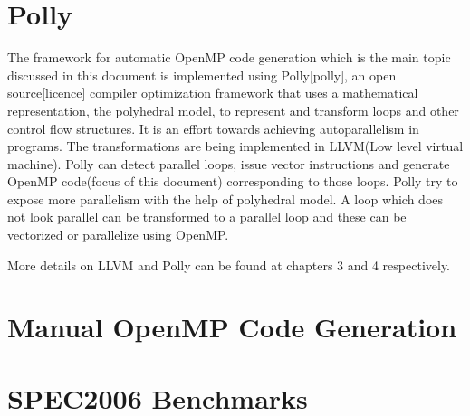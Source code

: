 \documentclass[a4paper,12pt]{book}
\begin{document}
\section{Polly}
The framework for automatic OpenMP code generation which is the main topic 
discussed in this document is implemented using Polly[polly],
an open source[licence] compiler  optimization framework that uses a mathematical
 representation, the polyhedral model, to represent and transform loops and other
 control flow structures. It is an effort towards achieving autoparallelism in programs.
 The transformations are being implemented in LLVM(Low level virtual machine). 
Polly can detect parallel loops, issue vector instructions and generate OpenMP code(focus of 
this document) corresponding to those loops. Polly try to expose more parallelism
with the help of polyhedral model. A loop which does not look parallel can be transformed
to a parallel loop and these can be vectorized or parallelize using OpenMP.

More details on LLVM and Polly can be found at chapters 3 and 4 respectively.

\section{Manual OpenMP Code Generation}

\section{SPEC2006 Benchmarks}
\end{document}
